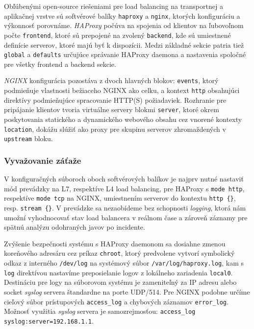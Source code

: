 \documentclass[12pt, a4paper]{article}
\begin{document}
Obľúbenými open-source riešeniami pre load balancing na transportnej a aplikačnej vrstve sú softvérové
balíky \verb|haproxy| a \verb|nginx|, ktorých konfiguráciu a výkonnosť porovnáme. \emph{HAProxy} počúva na 
spojenia od klientov na ľubovoľnom počte \verb|frontend|, ktoré sú prepojené na zvolený \verb|backend|, 
kde sú umiestnené definície serverov, ktoré majú byť k dispozícii. Medzi základné sekcie patria tiež 
\verb|global| a \verb|defaults| určujúce správanie HAProxy daemona a nastavenia spoločné pre všetky
frontend a backend sekcie.

\emph{NGINX} konfigurácia pozostáva z dvoch hlavných blokov: \verb|events|, ktorý podmieňuje vlastnosti
bežiaceho NGINX ako celku, a kontext \verb|http| obsahujúci direktívy podmieňujúce
spracovanie HTTP(S) požiadaviek. Rozhranie pre pripájanie klientov tvoria virtuálne servery blokmi
\verb|server|, ktoré okrem poskytovania statického a dynamického webového obsahu cez vnorené kontexty 
\verb|location|, dokážu slúžiť ako proxy pre skupinu serverov zhromaždených v \verb|upstream| bloku.
 
\subsubsection{Vyvažovanie záťaže}
V konfiguračných súboroch oboch softvérových balíkov je najprv nutné nastaviť mód prevádzky na L7, 
respektíve L4 load balancing, pre HAProxy s \verb|mode http|, respektíve \verb|mode tcp| na NGINX, 
umiestnením serverov do kontextu \verb|http {}|, resp. \verb|stream {}|. V prevádzke sa nezaobídeme bez 
schopnosti \emph{logging}, ktorá nám umožní vyhodnocovať stav load balancera v reálnom čase a zároveň 
záznamy pre spätnú analýzu odohraných javov po incidente. 

Zvýšenie bezpečnosti systému s HAProxy daemonom sa dosiahne zmenou koreňového adresáru cez príkaz
\verb|chroot|, ktorý predvolene vytvorí symbolický odkaz z interného \verb|/dev/log| na systémový súbor 
\verb|/var/log/haproxy.log|, kam s \verb|log| direktívou nastavíme preposielanie logov z lokálneho 
zariadenia \verb|local0|. Destináciu pre logy na súborovom systému je zameniteľný za IP adresu alebo  
socket \emph{syslog} servera štandardne na porte UDP/514. Pre NGINX podobne určíme cieľový súbor 
prístupových \verb|access_log| a chybových záznamov \verb|error_log|. Možnosť využitia
\emph{syslog} servera je samozrejmosťou: \verb|access_log syslog:server=192.168.1.1|.
\end{document}
